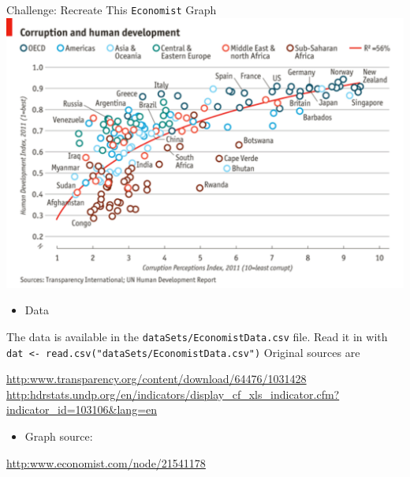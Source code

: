 \documentclass[table,smaller]{beamer}
\begin{document}
\begin{frame}[fragile,label=sec-8-1]{Challenge: Recreate This \texttt{Economist} Graph}
 \includegraphics[width=.9\linewidth]{images/Economist1.pdf}

\small
\begin{itemize}
\item Data
\end{itemize}
The data is available in the \verb~dataSets/EconomistData.csv~ file. Read it in with \verb~dat <- read.csv("dataSets/EconomistData.csv")~
Original sources are

\tiny

\url{http:www.transparency.org/content/download/64476/1031428}
\url{http:hdrstats.undp.org/en/indicators/display_cf_xls_indicator.cfm?indicator_id=103106&lang=en}

\small
\begin{itemize}
\item Graph source:
\end{itemize}

\tiny

\url{http:www.economist.com/node/21541178}

\small
\end{frame}
\end{document}

